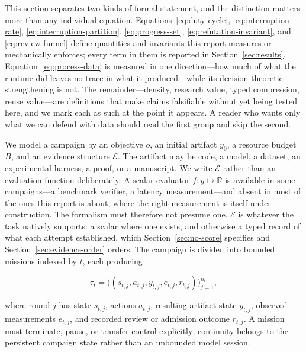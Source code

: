 This section separates two kinds of formal statement, and the distinction matters
more than any individual equation. Equations~\ref{eq:duty-cycle},
\ref{eq:interruption-rate}, \ref{eq:interruption-partition},
\ref{eq:progress-set}, \ref{eq:refutation-invariant}, and \ref{eq:review-funnel}
define quantities and invariants this report measures or mechanically enforces;
every term in them is reported in Section~\ref{sec:results}. Equation~\ref{eq:process-data} is measured in
one direction---how much of what the runtime did leaves no trace in what it
produced---while its decision-theoretic strengthening is not. The remainder---density,
research value, typed compression, reuse value---are definitions that make claims
falsifiable without yet being tested here, and we mark each as such at the point it
appears. A reader who wants only what we can defend with
data should read the first group and skip the second.

We model a campaign by an objective $o$, an initial artifact $y_0$, a resource budget
$B$, and an evidence structure $\mathcal{E}$. The artifact may be code, a model, a
dataset, an experimental harness, a proof, or a manuscript. We write $\mathcal{E}$
rather than an evaluation function deliberately. A scalar evaluator $f:y\mapsto
\mathbb{R}$ is available in some campaigns---a benchmark verifier, a latency
measurement---and absent in most of the ones this report is about, where the right
measurement is itself under construction. The formalism must therefore not presume
one. $\mathcal{E}$ is whatever the task natively supports: a scalar where one exists,
and otherwise a typed record of what each attempt established, which
Section~\ref{sec:no-score} specifies and Section~\ref{sec:evidence-order} orders. The campaign is divided
into bounded missions indexed by $t$, each producing

\begin{equation}
  \tau_t=\bigl((s_{t,j},a_{t,j},y_{t,j},e_{t,j},r_{t,j})\bigr)_{j=1}^{n_t},
  \label{eq:trajectory}
\end{equation}

where round $j$ has state $s_{t,j}$, actions $a_{t,j}$, resulting artifact state
$y_{t,j}$, observed measurements $e_{t,j}$, and recorded review or admission outcome
$r_{t,j}$. A mission
must terminate, pause, or transfer control explicitly; continuity belongs to the
persistent campaign state rather than an unbounded model session.

